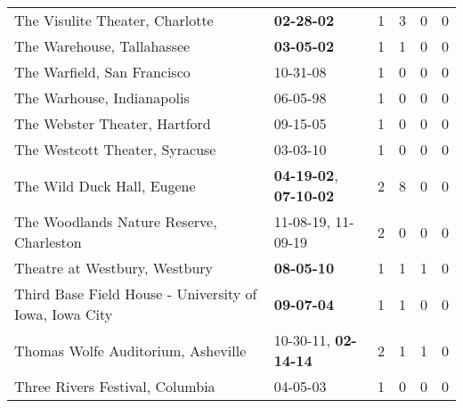 \begin{longtable}{p{}p{}p{}p{}p{}p{}}
                                              The Visulite Theater, Charlotte &                                       \textbf{02-28-02\textsuperscript{}} &  1 &  3 &  0 &  0 \\
                                                   The Warehouse, Tallahassee &                                       \textbf{03-05-02\textsuperscript{}} &  1 &  1 &  0 &  0 \\
                                                  The Warfield, San Francisco &                                                10-31-08\textsuperscript{} &  1 &  0 &  0 &  0 \\
                                                   The Warhouse, Indianapolis &                                                06-05-98\textsuperscript{} &  1 &  0 &  0 &  0 \\
                                                The Webster Theater, Hartford &                                                09-15-05\textsuperscript{} &  1 &  0 &  0 &  0 \\
                                               The Westcott Theater, Syracuse &                                                03-03-10\textsuperscript{} &  1 &  0 &  0 &  0 \\
                                                   The Wild Duck Hall, Eugene &  \textbf{04-19-02\textsuperscript{}}, \textbf{07-10-02\textsuperscript{}} &  2 &  8 &  0 &  0 \\
                                     The Woodlands Nature Reserve, Charleston &                    11-08-19\textsuperscript{}, 11-09-19\textsuperscript{} &  2 &  0 &  0 &  0 \\
                                                Theatre at Westbury, Westbury &                                       \textbf{08-05-10\textsuperscript{}} &  1 &  1 &  1 &  0 \\
                       Third Base Field House - University of Iowa, Iowa City &                                       \textbf{09-07-04\textsuperscript{}} &  1 &  1 &  0 &  0 \\
                                           Thomas Wolfe Auditorium, Asheville &           10-30-11\textsuperscript{}, \textbf{02-14-14\textsuperscript{}} &  2 &  1 &  1 &  0 \\
                                              Three Rivers Festival, Columbia &                                                04-05-03\textsuperscript{} &  1 &  0 &  0 &  0 \\

\end{longtable}
